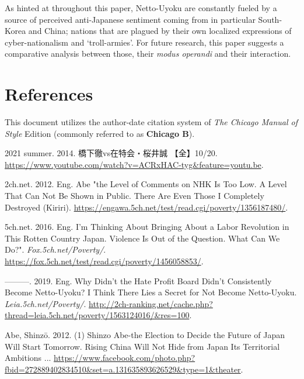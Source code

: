 \documentclass[10pt,british,A4paper,,openany]{memoir}
\begin{document}
As hinted at throughout this paper, Netto-Uyoku are constantly fueled by
a source of perceived anti-Japanese sentiment coming from in particular
South-Korea and China; nations that are plagued by their own localized
expressions of cyber-nationalism and `troll-armies'. For future
research, this paper suggests a comparative analysis between those,
their \emph{modus operandi} and their interaction.

\newpage

\begingroup
{}

\chapter*{References}

\setlength{\parindent}{-0.2in} \setlength{\leftskip}{0.2in}
\setlength{\parskip}{0em} \noindent

This document utilizes the author-date citation system of \emph{The
Chicago Manual of Style}  Edition (commonly referred to as
\textbf{Chicago B}).

\vspace{4mm} \setlength{\parskip}{0em} \footnotesize

\hypertarget{refs}{}
\hypertarget{ref-2021_summer_vs_2014}{}
2021 summer. 2014. 橋下徹vs在特会・桜井誠 【全】10/20.
\url{https://www.youtube.com/watch?v=ACRxHAC-tyg\&feature=youtu.be}.

\hypertarget{ref-2ch.net_eng._2012}{}
2ch.net. 2012. Eng. Abe "the Level of Comments on NHK Is Too Low. A
Level That Can Not Be Shown in Public. There Are Even Those I Completely
Destroyed (Kiriri).
\url{https://engawa.5ch.net/test/read.cgi/poverty/1356187480/}.

\hypertarget{ref-5ch.net_eng._2016}{}
5ch.net. 2016. Eng. I'm Thinking About Bringing About a Labor Revolution
in This Rotten Country Japan. Violence Is Out of the Question. What Can
We Do?". \emph{Fox.5ch.net/Poverty/}.
\url{https://fox.5ch.net/test/read.cgi/poverty/1456058853/}.

\hypertarget{ref-5ch.net_eng._2019}{}
---------. 2019. Eng. Why Didn't the Hate Profit Board Didn't
Consistently Become Netto-Uyoku? I Think There Lies a Secret for Not
Become Netto-Uyoku. \emph{Leia.5ch.net/Poverty/}.
\url{http://2ch-ranking.net/cache.php?thread=leia.5ch.net/poverty/1563124016/\&res=100}.

\hypertarget{ref-abe_1_2012}{}
Abe, Shinzō. 2012. (1) Shinzo Abe-the Election to Decide the Future of
Japan Will Start Tomorrow. Rising China Will Not Hide from Japan Its
Territorial Ambitions ...
\url{https://www.facebook.com/photo.php?fbid=272889402834510\&set=a.131635893626529\&type=1\&theater}.
\end{document}
